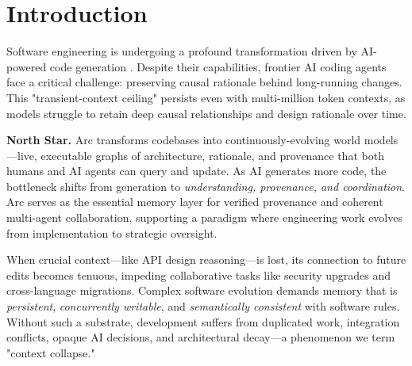 \documentclass{article}
\begin{document}
\section{Introduction}
Software engineering is undergoing a profound transformation driven by AI-powered code generation \cite{ref1, ref2}. Despite their capabilities, frontier AI coding agents face a critical challenge: preserving causal rationale behind long-running changes. This "transient-context ceiling" persists even with multi-million token contexts, as models struggle to retain deep causal relationships and design rationale over time.

\textbf{North Star.} Arc transforms codebases into continuously-evolving world models—live, executable graphs of architecture, rationale, and provenance that both humans and AI agents can query and update. As AI generates more code, the bottleneck shifts from generation to \textit{understanding, provenance, and coordination}. Arc serves as the essential memory layer for verified provenance and coherent multi-agent collaboration, supporting a paradigm where engineering work evolves from implementation to strategic oversight.

When crucial context—like API design reasoning—is lost, its connection to future edits becomes tenuous, impeding collaborative tasks like security upgrades and cross-language migrations. Complex software evolution demands memory that is \textit{persistent}, \textit{concurrently writable}, and \textit{semantically consistent} with software rules. Without such a substrate, development suffers from duplicated work, integration conflicts, opaque AI decisions, and architectural decay—a phenomenon we term "context collapse."
\end{document}
